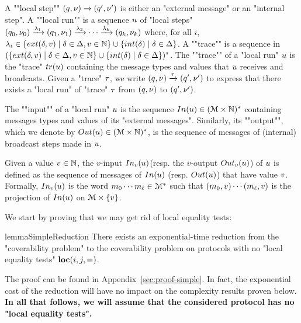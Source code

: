 \begin{definition}
	A ""local step"" $(q,\nu) \xrightarrow{} (q',\nu')$ is either an "external message" or an "internal step". 
	A ""local run"" is a sequence $u$ of "local steps" $(q_0, \nu_0) \xrightarrow{\lambda_1} (q_1, \nu_1) \xrightarrow{\lambda_2} \cdots \xrightarrow{\lambda_k} (q_k, \nu_k)$ where, for all $i$, $\locallabel_i \in \set{\extlabel{\atrans}{\aval} \mid \atrans \in \transitions, \aval \in \nats} \cup \set{\intlabel{\atrans} \mid \atrans \in \transitions}$. 
	A ""trace"" is a sequence in $(\set{\extlabel{\atrans}{\aval} \mid \atrans \in \transitions, \aval \in \nats} \cup \set{\intlabel{\atrans} \mid \atrans \in \transitions})^*$. The ""trace"" of a "local run" $u$ is the "trace" $\trace{\localrun}$ containing the message types and values that $u$ receives and broadcasts. Given a "trace" $\tau$, we write $(q,\nu) \xrightarrow{\tau} (q',\nu')$ to express that there exists a "local run" of "trace" $\tau$ from $(q,\nu)$ to $(q',\nu')$. %

	The ""input"" of a "local run" $u$ is the sequence $\Input{\localrun} \in (\messages \times \nats)^*$ containing messages types and values of its "external messages".
	Similarly, its ""output"", which we denote by $\Output{\localrun} \in (\messages \times \nats)^*$, is the sequence of messages of (internal) broadcast steps made in $u$.
	
	Given a value $v \in \mathbb{N} $, the $v$-input $\vinput{\aval}{\localrun} $(resp. the $v$-output $\voutput{\aval}{\localrun}$) of $u$ is defined as the sequence of messages of $\Input{\localrun}$ (resp. $\Output{\localrun}$) that have value $v$. Formally, $\vinput{\aval}{\localrun}$ is the word $m_0 \cdots m_{\ell} \in \mathcal{M}^*$ such that $(m_0, v) \cdots (m_{\ell}, v)$ is the projection of $\Input{\localrun}$ on $\mathcal{M} \times \{v\}$. 
\end{definition}


We start by proving that we may get rid of local equality tests:

\begin{restatable}{lemma}{SimpleReduction}
	\label{lem:simple-reduction}
	There exists an exponential-time reduction from the "coverability problem" to the coverability problem on protocols with no "local equality tests" $\textbf{loc}(i,j,=)$.
\end{restatable}

The proof can be found in Appendix~\ref{sec:proof-simple}. In fact, the exponential cost of the reduction will have no impact on the complexity results proven below.
\textbf{In all that follows, we will assume that the considered protocol has no "local equality tests". 
}


